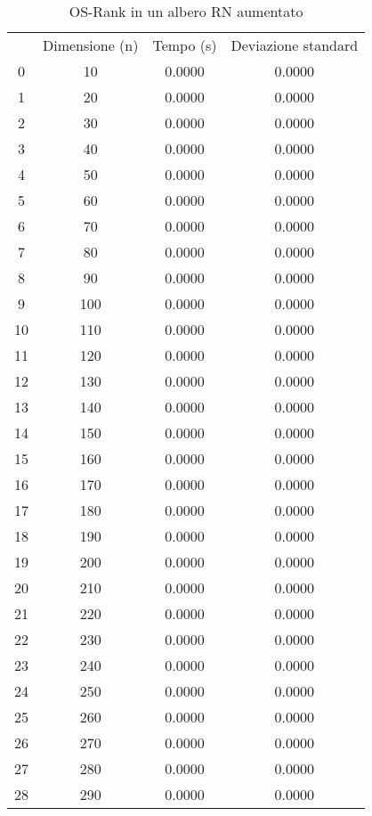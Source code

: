 \begin{table}[H]
\centering
\caption{OS-Rank in un albero RN aumentato}
\label{OS-Rank in un albero RN aumentato}
\begin{tabular}{cccc}
 & Dimensione (n) & Tempo (s) & Deviazione standard \\
0 & 10 & 0.0000 & 0.0000 \\
\cline{1-4}
1 & 20 & 0.0000 & 0.0000 \\
\cline{1-4}
2 & 30 & 0.0000 & 0.0000 \\
\cline{1-4}
3 & 40 & 0.0000 & 0.0000 \\
\cline{1-4}
4 & 50 & 0.0000 & 0.0000 \\
\cline{1-4}
5 & 60 & 0.0000 & 0.0000 \\
\cline{1-4}
6 & 70 & 0.0000 & 0.0000 \\
\cline{1-4}
7 & 80 & 0.0000 & 0.0000 \\
\cline{1-4}
8 & 90 & 0.0000 & 0.0000 \\
\cline{1-4}
9 & 100 & 0.0000 & 0.0000 \\
\cline{1-4}
10 & 110 & 0.0000 & 0.0000 \\
\cline{1-4}
11 & 120 & 0.0000 & 0.0000 \\
\cline{1-4}
12 & 130 & 0.0000 & 0.0000 \\
\cline{1-4}
13 & 140 & 0.0000 & 0.0000 \\
\cline{1-4}
14 & 150 & 0.0000 & 0.0000 \\
\cline{1-4}
15 & 160 & 0.0000 & 0.0000 \\
\cline{1-4}
16 & 170 & 0.0000 & 0.0000 \\
\cline{1-4}
17 & 180 & 0.0000 & 0.0000 \\
\cline{1-4}
18 & 190 & 0.0000 & 0.0000 \\
\cline{1-4}
19 & 200 & 0.0000 & 0.0000 \\
\cline{1-4}
20 & 210 & 0.0000 & 0.0000 \\
\cline{1-4}
21 & 220 & 0.0000 & 0.0000 \\
\cline{1-4}
22 & 230 & 0.0000 & 0.0000 \\
\cline{1-4}
23 & 240 & 0.0000 & 0.0000 \\
\cline{1-4}
24 & 250 & 0.0000 & 0.0000 \\
\cline{1-4}
25 & 260 & 0.0000 & 0.0000 \\
\cline{1-4}
26 & 270 & 0.0000 & 0.0000 \\
\cline{1-4}
27 & 280 & 0.0000 & 0.0000 \\
\cline{1-4}
28 & 290 & 0.0000 & 0.0000 \\

\end{tabular}
\end{table}
